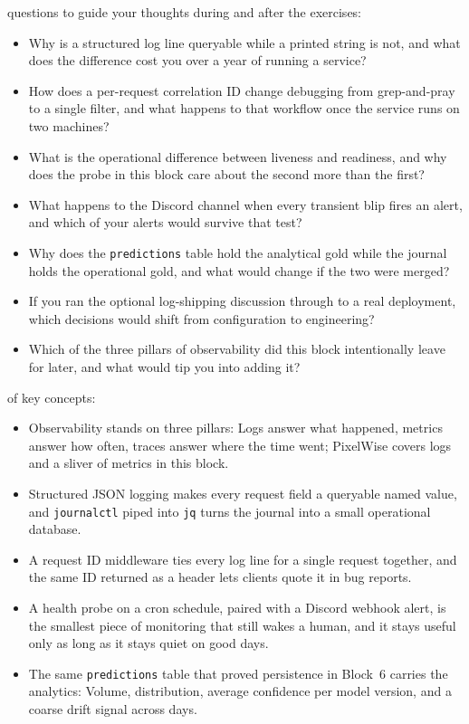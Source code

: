  questions to guide your thoughts during
and after the exercises:
\begin{itemize}
    \item Why is a structured log line queryable while a printed string is not, and what does the difference cost you over a year of running a service?
    \item How does a per-request correlation ID change debugging from grep-and-pray to a single filter, and what happens to that workflow once the service runs on two machines?
    \item What is the operational difference between liveness and readiness, and why does the probe in this block care about the second more than the first?
    \item What happens to the Discord channel when every transient blip fires an alert, and which of your alerts would survive that test?
    \item Why does the \texttt{predictions} table hold the analytical gold while the journal holds the operational gold, and what would change if the two were merged?
    \item If you ran the optional log-shipping discussion through to a real deployment, which decisions would shift from configuration to engineering?
    \item Which of the three pillars of observability did this block intentionally leave for later, and what would tip you into adding it?
\end{itemize}

 of key concepts:
\begin{itemize}
    \item Observability stands on three pillars: Logs answer what happened, metrics answer how often, traces answer where the time went; PixelWise covers logs and a sliver of metrics in this block.
    \item Structured JSON logging makes every request field a queryable named value, and \texttt{journalctl} piped into \texttt{jq} turns the journal into a small operational database.
    \item A request ID middleware ties every log line for a single request together, and the same ID returned as a header lets clients quote it in bug reports.
    \item A health probe on a cron schedule, paired with a Discord webhook alert, is the smallest piece of monitoring that still wakes a human, and it stays useful only as long as it stays quiet on good days.
    \item The same \texttt{predictions} table that proved persistence in Block~6 carries the analytics: Volume, distribution, average confidence per model version, and a coarse drift signal across days.
\end{itemize}

